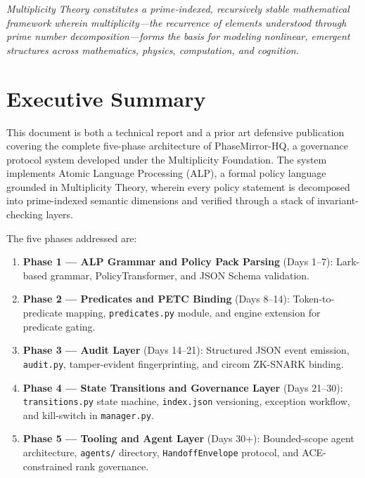 \documentclass[12pt,letterpaper]{article}
\theoremstyle{definition}
\theoremstyle{remark}
\begin{document}
\begin{titlepage}
\vfill

{\small\color{gray}\textit{
  Multiplicity Theory constitutes a prime-indexed, recursively stable mathematical
  framework wherein multiplicity—the recurrence of elements understood through prime
  number decomposition—forms the basis for modeling nonlinear, emergent structures
  across mathematics, physics, computation, and cognition.}}

\end{titlepage}

\tableofcontents
\newpage

\section*{Executive Summary}

This document is both a technical report and a prior art defensive publication covering
the complete five-phase architecture of PhaseMirror-HQ, a governance protocol system
developed under the Multiplicity Foundation. The system implements Atomic Language
Processing (ALP), a formal policy language grounded in Multiplicity Theory, wherein
every policy statement is decomposed into prime-indexed semantic dimensions and verified
through a stack of invariant-checking layers.

The five phases addressed are:
\begin{enumerate}[leftmargin=2em]
  \item \textbf{Phase 1 — ALP Grammar and Policy Pack Parsing} (Days 1–7): Lark-based
        grammar, PolicyTransformer, and JSON Schema validation.
  \item \textbf{Phase 2 — Predicates and PETC Binding} (Days 8–14): Token-to-predicate
        mapping, \texttt{predicates.py} module, and engine extension for predicate gating.
  \item \textbf{Phase 3 — Audit Layer} (Days 14–21): Structured JSON event emission,
        \texttt{audit.py}, tamper-evident fingerprinting, and circom ZK-SNARK binding.
  \item \textbf{Phase 4 — State Transitions and Governance Layer} (Days 21–30):
        \texttt{transitions.py} state machine, \texttt{index.json} versioning, exception
        workflow, and kill-switch in \texttt{manager.py}.
  \item \textbf{Phase 5 — Tooling and Agent Layer} (Days 30+): Bounded-scope agent
        architecture, \texttt{agents/} directory, \texttt{HandoffEnvelope} protocol, and
        ACE-constrained rank governance.
\end{enumerate}
\end{document}
